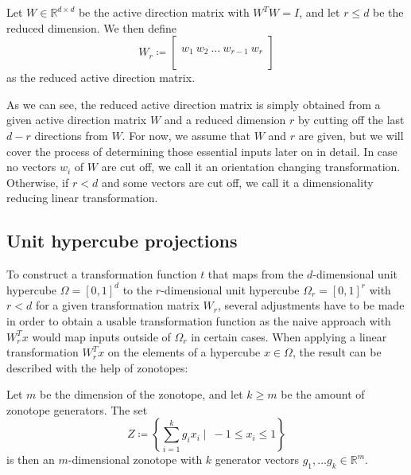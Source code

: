 \documentclass[
  a4paper,  %
  twoside,  %
  bibliography=totoc,
  headsepline,
  cleardoublepage=empty,
  parskip=half,
  draft=false
]{scrbook}
\begin{document}
\begin{definition}
Let $W \in \mathds{R}^{d \times d}$ be the active direction matrix with $W^T W=I$, and let $r \leq d$ be the reduced dimension.
We then define
\begin{equation}
W_r \coloneqq \begin{bmatrix}
  \\
    w_1 ~ w_2 ~ \dots ~ w_{r-1} ~ w_r\\
    \\
  \end{bmatrix}
\end{equation}
as the reduced active direction matrix.
\end{definition}
%
As we can see, the reduced active direction matrix is simply obtained from a given active direction matrix $W$ and a reduced dimension $r$ by cutting off the last $d - r$ directions from $W$.
For now, we assume that $W$ and $r$ are given, but we will cover the process of determining those essential inputs later on in detail.
In case no vectors $w_i$ of $W$ are cut off, we call it an orientation changing transformation.
Otherwise, if $r < d$ and some vectors are cut off, we call it a dimensionality reducing linear transformation.

\subsection{Unit hypercube projections}

To construct a transformation function $t$ that maps from the $d$-dimensional unit hypercube $\Omega=[0,1]^d$ to the $r$-dimensional unit hypercube $\Omega_r=[0,1]^r$ with $r < d$ for a given transformation matrix $W_r$, several adjustments have to be made in order to obtain a usable transformation function as the naive approach with $W_r^T x$ would map inputs outside of $\Omega_r$ in certain cases.
When applying a linear transformation $W_r^T x$ on the elements of a hypercube $x \in \Omega$, the result can be described with the help of zonotopes:
\begin{definition}[Zonotope]
Let $m$ be the dimension of the zonotope, and let $k \geq  m$ be the amount of zonotope generators.
The set
\begin{equation}
Z \coloneqq \left\{\sum_{i=1}^k g_i x_i \mid ~ -1 \leq x_i \leq 1\right\}
  \label{zonotope}
\end{equation}
is then an $m$-dimensional zonotope  with $k$ generator vectors $g_1, \dots g_k \in \mathds{R}^m$.
\end{definition}
\end{document}
